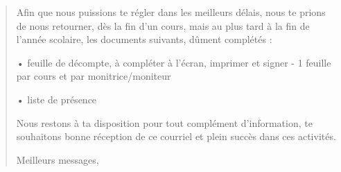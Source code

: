 \documentclass[letterpaper,10pt,english]{sphinxmanual}
\begin{document}
\begin{quote}
\begin{description}
\begin{DUlineblock}{0em}
\item[] 
\item[] Afin que nous puissions te régler dans les meilleurs délais, nous te prions de nous retourner, dès la fin d'un cours, mais au plus tard à la fin de l'année scolaire, les documents suivants, dûment complétés :
\item[] 
\item[] • feuille de décompte, à compléter à l'écran, imprimer et signer - 1 feuille par cours et par monitrice/moniteur
\item[] • liste de présence
\item[] 
\item[] Nous restons à ta disposition pour tout complément d'information, te souhaitons bonne réception de ce courriel et plein succès dans ces activités.
\item[] 
\item[] Meilleurs messages,
\end{DUlineblock}

\end{description}\end{quote}
\end{document}
